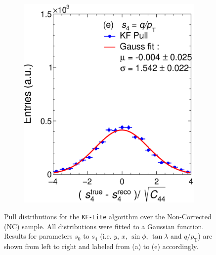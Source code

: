 \begin{figure}[t]
\begin{subfigure}{0.32\textwidth}
         \includegraphics[width=\textwidth]{figures/ch4-KF_NDGArLite/Toy/NoCorr/UnitKFEnd_p4.eps}
         \caption{}
         \label{fig:resp4KF_GArLite_NoCorr}
     \end{subfigure}
        \caption[Pull distributions for the \texttt{KF-Lite} algorithm over the Non-Corrected (NC) sample.]{Pull distributions for the \texttt{KF-Lite} algorithm over the Non-Corrected (NC) sample. All distributions were fitted to a Gaussian function. Results for parameters $s_0$ to $s_4$ (i.e. $y$, $x$, $\sin\phi$, $\tan\lambda$ and $q/p_{\text{T}}$) are shown from left to right and labeled from (a) to (e) accordingly. }
        \label{fig:ToyUnitKF_GArLite_NoCorr}
\end{figure}

